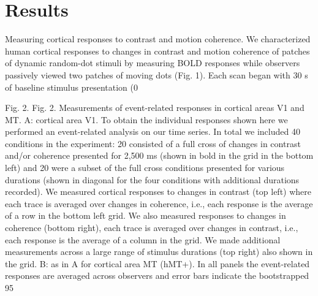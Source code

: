 \documentclass{report}
\begin{document}
\section{Results}
Measuring cortical responses to contrast and motion coherence.
We characterized human cortical responses to changes in contrast and motion coherence of patches of dynamic random-dot stimuli by measuring BOLD responses while observers passively viewed two patches of moving dots (Fig. 1). Each scan began with 30 s of baseline stimulus presentation (0%

Fig. 2.
Fig. 2.
Measurements of event-related responses in cortical areas V1 and MT. A: cortical area V1. To obtain the individual responses shown here we performed an event-related analysis on our time series. In total we included 40 conditions in the experiment: 20 consisted of a full cross of changes in contrast and/or coherence presented for 2,500 ms (shown in bold in the grid in the bottom left) and 20 were a subset of the full cross conditions presented for various durations (shown in diagonal for the four conditions with additional durations recorded). We measured cortical responses to changes in contrast (top left) where each trace is averaged over changes in coherence, i.e., each response is the average of a row in the bottom left grid. We also measured responses to changes in coherence (bottom right), each trace is averaged over changes in contrast, i.e., each response is the average of a column in the grid. We made additional measurements across a large range of stimulus durations (top right) also shown in the grid. B: as in A for cortical area MT (hMT+). In all panels the event-related responses are averaged across observers and error bars indicate the bootstrapped 95%
\end{document}
